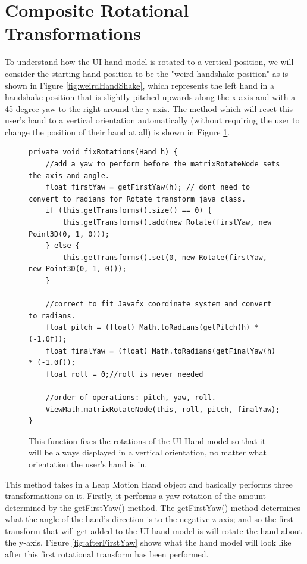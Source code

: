 	
\section{Composite Rotational Transformations}
To understand how the UI hand model is rotated to a vertical position, we will consider the starting hand position to be the "weird handshake position" as is shown in Figure \ref{fig:weirdHandShake}, which represents the left hand in a handshake position that is slightly pitched upwards along the x-axis and with a 45 degree yaw to the right around the y-axis. The method which will reset this user's hand to a vertical orientation automatically (without requiring the user to change the position of their hand at all) is shown in Figure \ref{fig:fixRotationsCode}. 
\begin{figure}[H]
\centering
\begin{lstlisting}
private void fixRotations(Hand h) {
	//add a yaw to perform before the matrixRotateNode sets the axis and angle.
	float firstYaw = getFirstYaw(h); // dont need to convert to radians for Rotate transform java class.
	if (this.getTransforms().size() == 0) {
		this.getTransforms().add(new Rotate(firstYaw, new Point3D(0, 1, 0)));
	} else {
		this.getTransforms().set(0, new Rotate(firstYaw, new Point3D(0, 1, 0)));
	}

	//correct to fit Javafx coordinate system and convert to radians.
	float pitch = (float) Math.toRadians(getPitch(h) * (-1.0f));
	float finalYaw = (float) Math.toRadians(getFinalYaw(h) * (-1.0f));
	float roll = 0;//roll is never needed

	//order of operations: pitch, yaw, roll.
	ViewMath.matrixRotateNode(this, roll, pitch, finalYaw);
}
\end{lstlisting}
\caption[fixRotations() Function]{This function fixes the rotations of the UI Hand model so that it will be always displayed in a vertical orientation, no matter what orientation the user's hand is in.}
\label{fig:fixRotationsCode}
\end{figure}
This method takes in a Leap Motion Hand object and basically performs three transformations on it. Firstly, it performs a yaw rotation of the amount determined by the getFirstYaw() method. The getFirstYaw() method determines what the angle of the hand's direction is to the negative z-axis; and so the first transform that will get added to the UI hand model is will rotate the hand about the y-axis. Figure \ref{fig:afterFirstYaw} shows what the hand model will look like after this first rotational transform has been performed. 
